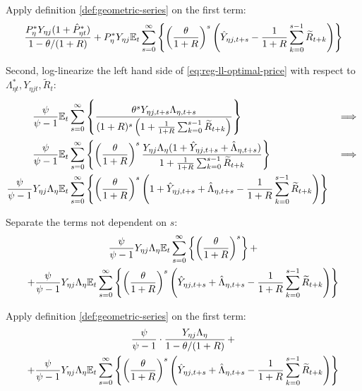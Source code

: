 \documentclass[../thesis.tex]{subfiles}
\begin{document}
Apply definition \ref{def:geometric-series} on the first term:
\begin{align}
	\frac{ P_{\eta}^{\ast} Y_{\eta j} ( 1 + \hat{P}_{\eta t}^{\ast} )}{1-\theta /(1+R)} + P_{\eta}^{\ast} Y_{\eta j} {\mathbb{E}_{t}} \sum_{s=0}^{\infty} \left\{ \left( \frac{\theta}{1 + R} \right)^s \left( \hat{Y}_{\eta j, t+s} - \frac{1}{1 + R} \sum_{k=0}^{s-1} \widetilde{R}_{t+k} \right) \right\} \nonumber
\end{align}

Second, log-linearize the left hand side of \ref{eq:reg-ll-optimal-price} with respect to \( \Lambda_{\eta t}^{\ast}, Y_{\eta j t}, \widetilde{R}_t \):
\begin{alignat}{2}
	\frac{\psi}{\psi-1} &{\mathbb{E}_{t}} \sum_{s=0}^{\infty} \left\{ \frac{\theta^s Y_{\eta j,t+s} \Lambda_{\eta, t+s}}{ (1 + R)^s \left( 1 + \frac{1}{1 + R} \sum_{k=0}^{s-1} \widetilde{R}_{t+k} \right)} \right\} & \implies \nonumber \\
	\frac{\psi}{\psi-1} &{\mathbb{E}_{t}} \sum_{s=0}^{\infty} \left\{ \left( \frac{\theta}{1 + R} \right)^s \frac{ Y_{\eta j} \Lambda_{\eta} (1+ \hat{Y}_{\eta j, t+s} + \hat{\Lambda}_{\eta, t+s})}{ 1 + \frac{1}{1 + R} \sum_{k=0}^{s-1} \widetilde{R}_{t+k}} \right\} & \implies \nonumber \\
	\frac{\psi}{\psi-1} Y_{\eta j} \Lambda_{\eta} &{\mathbb{E}_{t}} \sum_{s=0}^{\infty} \left\{ \left( \frac{\theta}{1 + R} \right)^s \left( 1+ \hat{Y}_{\eta j, t+s} + \hat{\Lambda}_{\eta, t+s} - \frac{1}{1 + R} \sum_{k=0}^{s-1} \widetilde{R}_{t+k} \right) \right\} & \nonumber
\end{alignat}

Separate the terms not dependent on $s$:
\begin{multline}
	\frac{\psi}{\psi-1} Y_{\eta j} \Lambda_{\eta} {\mathbb{E}_{t}} \sum_{s=0}^{\infty} \left\{ \left( \frac{\theta}{1 + R} \right)^s \right\} + 
	\\
	+ \frac{\psi}{\psi-1} Y_{\eta j} \Lambda_{\eta} {\mathbb{E}_{t}} \sum_{s=0}^{\infty} \left\{ \left( \frac{\theta}{1 + R} \right)^s \left( \hat{Y}_{\eta j, t+s} + \hat{\Lambda}_{\eta, t+s} - \frac{1}{1 + R} \sum_{k=0}^{s-1} \widetilde{R}_{t+k} \right) \right\} \nonumber
\end{multline}

Apply definition \ref{def:geometric-series} on the first term:
\begin{multline}
	\frac{\psi}{\psi-1} \cdot \frac{Y_{\eta j} \Lambda_{\eta}}{1-\theta /(1+R)} \, + 
	\\
	+ \frac{\psi}{\psi-1} Y_{\eta j} \Lambda_{\eta} {\mathbb{E}_{t}} \sum_{s=0}^{\infty} \left\{ \left( \frac{\theta}{1 + R} \right)^s \left( \hat{Y}_{\eta j, t+s} + \hat{\Lambda}_{\eta, t+s} - \frac{1}{1 + R} \sum_{k=0}^{s-1} \widetilde{R}_{t+k} \right) \right\} \nonumber
\end{multline}
\end{document}
